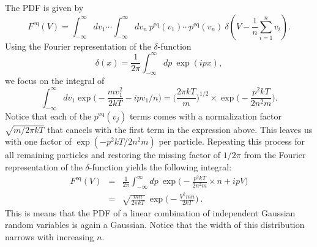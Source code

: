 The PDF is given by
\begin{equation}
F^\text{eq}(V) = \int_{-\infty}^{\infty} dv_1 \cdots \int_{-\infty}^{\infty} dv_n ~ p^\text{eq}(v_1) \cdots p^\text{eq}(v_n) ~ \delta(V - \frac{1}{n}\sum_{i=1}^{n} v_i).
\end{equation}
Using the Fourier representation of the $\delta$-function
\begin{equation}
\delta(x) = \frac{1}{2\pi} \int_{-\infty}^{\infty} dp ~ \exp(i p x),
\end{equation}
we focus on the integral of 
\begin{equation}
\int_{-\infty}^{\infty} dv_1 \exp\bigg(-\frac{m v_1^2}{2 k T} -i p v_1/n\bigg) =  \bigg( \frac{2\pi k T}{m}\bigg)^{1/2} \times \exp\bigg(-\frac{p^2 k T }{2 n^2 m}\bigg).
\end{equation}
Notice that each of the $p^\text{eq}(v_j)$ terms comes with a normalization factor $\sqrt{m/2 \pi k T}$ that cancels with the first term in the expression above. This leaves us with one factor of $\exp(-p^2 k T/2 n^2 m)$ per particle. Repeating this process for all remaining particles and restoring the missing factor of $1/2\pi$ from the Fourier representation of the $\delta$-function yields the following integral:
\begin{eqnarray}
F^\text{eq}(V) &=& \frac{1}{2\pi}\int_{-\infty}^{\infty} dp ~ \exp\bigg(-\frac{p^2 k T }{2 n^2 m} \times n + i p V\bigg)\\
&=&  \boxed{\sqrt{\frac{m n}{2\pi k T}} ~ \exp\bigg(-\frac{V^2 m n }{2 k T} \bigg)}~.
\end{eqnarray}
This is means that the PDF of a linear combination of independent Gaussian random variables is again a Gaussian. Notice that the width of this distribution narrows with increasing $n$.
